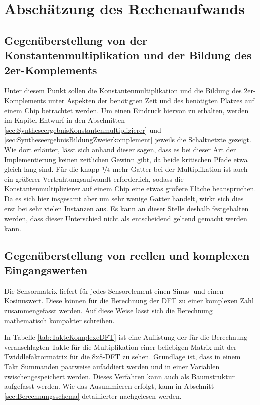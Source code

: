 \section{Abschätzung des Rechenaufwands}\label{sec:abschaetzung_Rechenaufwand}

\subsection{Gegenüberstellung von der Konstantenmultiplikation und der Bildung des 2er-Komplements}
Unter diesem Punkt sollen die Konstantenmultiplikation und die Bildung des 2er-Komplements unter Aspekten der benötigten Zeit und des benötigten Platzes auf einem Chip 
betrachtet werden. Um einen Eindruck hiervon zu erhalten, werden im Kapitel Entwurf in den Abschnitten \ref{sec:SyntheseergebnisKonstantenmultiplizierer} und
\ref{sec:SyntheseergebnisBildungZweierkomplement} jeweils die Schaltnetzte 
gezeigt.
Wie dort erläuter, lässt sich anhand dieser sagen, dass es bei dieser Art der Implementierung keinen zeitlichen Gewinn gibt, da beide kritischen Pfade etwa gleich lang 
sind. Für die knapp $\nicefrac{1}{4}$ mehr Gatter bei der Multiplikation ist auch ein größerer Vertrahtungsaufwandt erforderlich, sodass die Konstantenmultiplizierer
auf einem Chip eine etwas größere Fläche beanspruchen. Da es sich hier insgesamt aber um sehr wenige Gatter handelt, wirkt sich dies erst bei sehr vielen Instanzen aus.
Es kann an dieser Stelle deshalb festgehalten werden, dass dieser Unterschied nicht als entscheidend geltend gemacht werden kann.
 
\subsection{Gegenüberstellung von reellen und komplexen Eingangswerten}\label{sec:GegenüberstellungRelleKomplexeEingangswerte}
Die Sensormatrix liefert für jedes Sensorelement einen Sinus- und einen Kosinuswert. Diese können für die Berechnung der DFT zu einer komplexen Zahl zusammengefasst werden. 
Auf diese Weise lässt sich die Berechnung mathematisch kompakter schreiben.


In Tabelle \ref{tab:TakteKomplexeDFT} ist eine Auflistung der für die Berechnung veranschlagten Takte für die Multiplikation einer beliebigen Matrix mit der
Twiddlefaktormatrix für die 8x8-DFT zu sehen. Grundlage ist, dass in einem Takt Summanden 
paarweise aufaddiert werden und in einer Variablen zwischengespeichert werden. Dieses Verfahren kann auch als Baumstruktur aufgefasst werden. 
Wie das Ausummieren erfolgt, kann in Abschnitt \ref{sec:Berechnungsschema} detaillierter nachgelesen werden.

